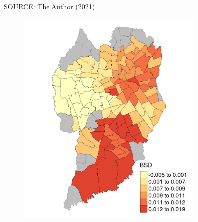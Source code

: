 \begin{figure}[!htbp]
\begin{subfigure}{0.5\textwidth}
    \end{subfigure}    
    \label{fig:gwr_ldi}
    \par SOURCE: The Author (2021)
\end{figure}

\begin{figure}[!htbp]
    \centering\footnotesize
    \captionsetup{font=footnotesize}
    \caption{BSD COEFFICIENT ESTIMATES}
    \begin{subfigure}{0.5\textwidth}
        \includegraphics{fig/BSD.png}
    \end{subfigure}%
    \begin{subfigure}{0.5\textwidth}

\end{subfigure}
\end{figure}
